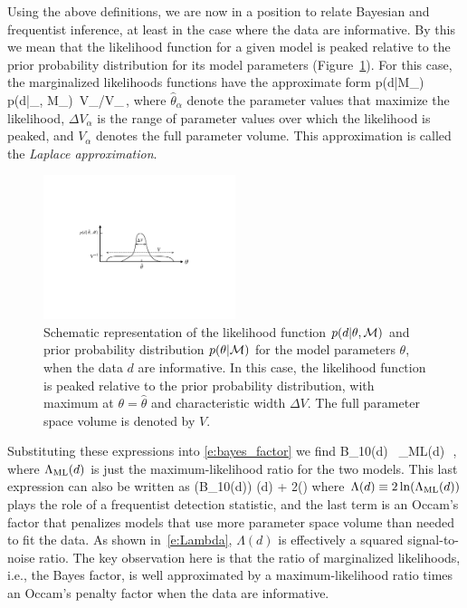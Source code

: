 Using the above definitions, we are now in a position to 
relate Bayesian and frequentist inference, at least in the 
case where the data are informative.
By this we mean that the likelihood function for a given
model is peaked relative to the prior probability 
distribution for its model parameters 
(Figure~\ref{f:informative_data}).
For this case, the marginalized likelihoods functions 
have the approximate form 
%
\be
p(d|{\cal M}_\alpha) 
\simeq
p(d|\hat\theta_\alpha, {\cal M}_\alpha)
\,{\Delta V_\alpha}/{V_\alpha}\,,
\ee
%
where $\hat\theta_\alpha$ denote the parameter values that
maximize the likelihood, $\Delta V_\alpha$ is the range of
parameter values over which the likelihood is peaked, and 
$V_\alpha$ denotes the full parameter volume.
This approximation is called the {\em Laplace approximation}.
%
\begin{figure}[htbp!]
\begin{center}
\includegraphics[width=0.5\textwidth]{Figures/informative_data}
\caption{Schematic representation of the likelihood function 
$p(d|\theta,{\cal M})$ and prior probability distribution 
$p(\theta|{\cal M})$ for the model parameters $\theta$,
when the data $d$ are informative.
In this case, the likelihood function is peaked relative to the 
prior probability distribution, with maximum at 
$\theta=\hat\theta$ and characteristic width $\Delta V$.
The full parameter space volume is denoted by $V$.}
\label{f:informative_data}
\end{center}
\end{figure}
%
Substituting these expressions into \eqref{e:bayes_factor} we find
%
\be
{\cal B}_{10}(d) 
\equiv{}
\simeq {}
\,
\simeq\Lambda_{\rm ML}(d)
\,\,,
\ee
where $\Lambda_{\rm ML}(d)$ is just the maximum-likelihood
ratio for the two models.
This last expression can also be written as
%
\ln({\cal B}_{10}(d)) \simeq \Lambda(d) + 
2\ln\left(\right)
\label{e:BF-SNR}
\ee
%
where $\Lambda(d)\equiv 2\ln(\Lambda_{\rm ML}(d))$
plays the role of a frequentist detection statistic, 
and the last term is an Occam's factor that penalizes
models that use more parameter space volume than needed
to fit the data.
As shown in~\eqref{e:Lambda}, $\Lambda(d)$ is effectively
a squared signal-to-noise ratio.
The key observation here is that the ratio of marginalized
likelihoods, i.e., the Bayes factor, 
is well approximated by a maximum-likelihood 
ratio times an Occam's penalty factor when the data are informative.

